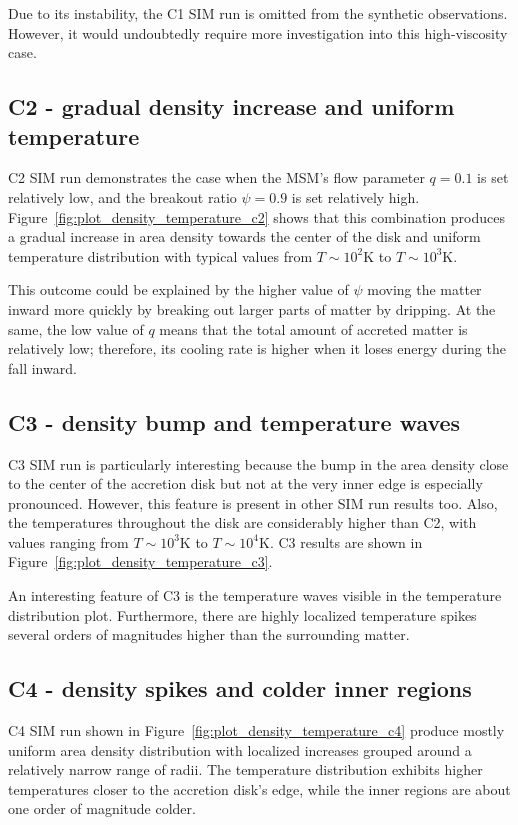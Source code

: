     Due to its instability, the C1 SIM run is omitted from the synthetic observations. However, it would undoubtedly require more investigation into this high-viscosity case.  

\subsection{C2 - gradual density increase and uniform temperature}
    C2 SIM run demonstrates the case when the MSM's flow parameter $q = 0.1$ is set relatively low, and the breakout ratio $\psi = 0.9$ is set relatively high. Figure~\ref{fig:plot_density_temperature_c2} shows that this combination produces a gradual increase in area density towards the center of the disk and uniform temperature distribution with typical values from $T \sim 10^2 \si{\kelvin}$ to $T \sim 10^3 \si{\kelvin}$. 

    This outcome could be explained by the higher value of $\psi$ moving the matter inward more quickly by breaking out larger parts of matter by dripping. At the same, the low value of $q$ means that the total amount of accreted matter is relatively low; therefore, its cooling rate is higher when it loses energy during the fall inward. 

\subsection{C3 - density bump and temperature waves}
    C3 SIM run is particularly interesting because the bump in the area density close to the center of the accretion disk but not at the very inner edge is especially pronounced. However, this feature is present in other SIM run results too. Also, the temperatures throughout the disk are considerably higher than C2, with values ranging from $T \sim 10^3\si{\kelvin}$ to $T \sim 10^4\si{\kelvin}$. C3 results are shown in Figure~\ref{fig:plot_density_temperature_c3}. 

    An interesting feature of C3 is the temperature waves visible in the temperature distribution plot. Furthermore, there are highly localized temperature spikes several orders of magnitudes higher than the surrounding matter.

\subsection{C4 - density spikes and colder inner regions}
    C4 SIM run shown in Figure~\ref{fig:plot_density_temperature_c4} produce mostly uniform area density distribution with localized increases grouped around a relatively narrow range of radii. The temperature distribution exhibits higher temperatures closer to the accretion disk's edge, while the inner regions are about one order of magnitude colder. 

